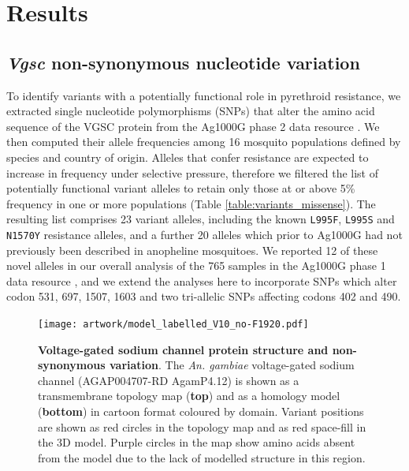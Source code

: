 \documentclass[a4paper,11pt,abstracton,hidelinks]{scrartcl}
\begin{document}
\section*{Results}


\subsection*{\textit{Vgsc} non-synonymous nucleotide variation}


%
To identify variants with a potentially functional role in pyrethroid resistance, we extracted single nucleotide polymorphisms (SNPs) that alter the amino acid sequence of the VGSC protein from the Ag1000G phase 2 data resource \cite{clarkson2019genome}.
%
We then computed their allele frequencies among 16 mosquito populations defined by species and country of origin.
%
Alleles that confer resistance are expected to increase in frequency under selective pressure, therefore we filtered the list of potentially functional variant alleles to retain only those at or above 5\% frequency in one or more populations (Table \ref{table:variants_missense}).
%
The resulting list comprises 23 variant alleles, including the known \texttt{L995F}, \texttt{L995S} and \texttt{N1570Y} resistance alleles, and a further 20 alleles which prior to Ag1000G had not previously been described in anopheline mosquitoes.
%
We reported 12 of these novel alleles in our overall analysis of the 765 samples in the Ag1000G phase 1 data resource \cite{Ag1000gConsortium2017}, and we extend the analyses here to incorporate SNPs which alter codon 531, 697, 1507, 1603 and two tri-allelic SNPs affecting codons 402 and 490.

%
\begin{figure}[!t]

  \centering

  \texttt{[image: artwork/model\_labelled\_V10\_no-F1920.pdf]}

  \caption{\textbf{Voltage-gated sodium channel protein structure and non-synonymous variation}. The \textit{An. gambiae} voltage-gated sodium channel (AGAP004707-RD AgamP4.12) is shown as a transmembrane topology map (\textbf{top}) and as a homology model (\textbf{bottom}) in cartoon format coloured by domain. Variant positions are shown as red circles in the topology map and as red space-fill in the 3D model. Purple circles in the map show amino acids absent from the model due to the lack of modelled structure in this region.}

  \label{fig:protein}

\end{figure}
\end{document}
